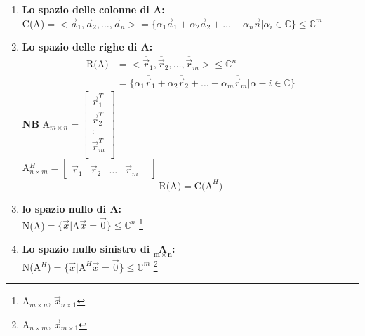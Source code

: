 \begin{enumerate}
    \item \textbf{Lo spazio delle colonne di A:}\\
        C(A)$=<\vec{a}_1,\vec{a}_2,\dots, \vec{a}_n >= \{\alpha_1\vec{a}_1+\alpha_2\vec{a}_2+\dots+\alpha_n\vec{n}|
        \alpha_i\in\mathbb{C}
        \}\leq \mathbb{C}^m$
    \item \textbf{Lo spazio delle righe di A:}\\
        \begin{align*}
            \textrm{R(A)} & =<\overline{\vec{r}}_1, \overline{\vec{r}}_2,\dots, \overline{\vec{r}}_m> \leq \mathbb{C}^n\\
            & =\{\alpha_1\overline{\vec{r}}_1+\alpha_2\overline{\vec{r}}_2+\dots+\alpha_m\overline{\vec{r}}_m| 
            \alpha-i\in\mathbb{C}\}
        \end{align*}
        \textbf{NB} A$_{m\times n} = 
        \begin{bmatrix}
            \vec{r}^T_1\\
            \vec{r}^T_2\\
            :\\
            \vec{r}^T_m\\
        \end{bmatrix}$\\
        A$^H_{n\times m}= 
        \begin{bmatrix}
            \overline{\vec{r}}_1 &     
            \overline{\vec{r}}_2 &     
            \dots & 
            \overline{\vec{r}}_m &     
        \end{bmatrix}
        $
        \[
            \textrm{R(A)} = \textrm{C(A}^H)
        \]
    \item \textbf{lo spazio nullo di A:}\\
        N(A)$=\{\vec{x}|$A$\vec{x}=\vec{0}\}\leq \mathbb{C}^n$
        \footnote{A$_{m\times n }$, $\vec{x}_{n\times 1}$} 
    \item \textbf{Lo spazio nullo sinistro di $\pmb{\underset{m\times n}{\textrm{A}}}$:}\\
        N(A$^H$)$=\{\vec{x}|\textrm{A}^H\vec{x}=\vec{0}\}\leq \mathbb{C}^m$
        \footnote{A$_{n\times m }$, $\vec{x}_{m\times 1}$}
\end{enumerate}

